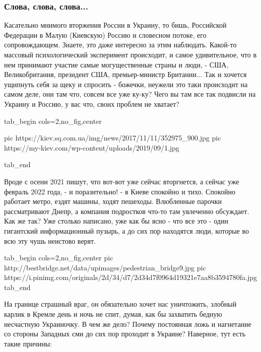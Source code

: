  
 
 
 
 
\clearpage
\subsubsection{Слова, слова, слова...}

Касательно мнимого вторжения России в Украину, то бишь, Российской Федерации в
Малую (Киевскую) Россию и словесном потоке, его сопровождающем.  Знаете, это
даже интересно за этим наблюдать. Какой-то массовый психологический эксперимент
происходит, и самое удивительное, что в нем принимают участие самые
могущественные страны и люди, - США, Великобритания, президент США,
премьер-министр Британии... Так и хочется ущипнуть себя за щеку и спросить -
божечки, неужели это таки происходит на самом деле, они там что, совсем все уже
ку-ку? Чего вы там все так подвисли на Украину и Россию, у вас что, своих
проблем не хватает?

\ifcmt
  tab_begin cols=2,no_fig,center

     pic https://kiev.sq.com.ua/img/news/2017/11/11/352975_900.jpg
		 pic https://my-kiev.com/wp-content/uploads/2019/09/1.jpg

  tab_end
\fi

Вроде с осени 2021 пишут, что вот-вот уже сейчас вторгнется, а сейчас уже
февраль 2022 года, - и поразительно! - в Киеве спокойно и тихо. Спокойно
работает метро, ездят машины, ходят пешеходы. Влюбленные парочки рассматривают
Днепр, а компания подростков что-то там увлеченно обсуждает.  Как же так? Уже
столько написано, уже как бы ясно - что все это - один гигантский
информационный пузырь, а до сих пор находятся люди, которые во всю эту чушь
неистово верят. 

\ifcmt
  tab_begin cols=2,no_fig,center
     pic http://bestbridge.net/data/upimages/pedestrian_bridge9.jpg
		 pic https://i.pinimg.com/originals/2d/34/d7/2d34d7f0964d19321e7aa8b3594780fa.jpg
  tab_end
\fi

На границе страшный враг, он обязательно хочет нас уничтожить, злобный карлик в
Кремле день и ночь не спит, думая, как бы захватить бедную несчастную
Украиночку. В чем же дело?  Почему постоянная ложь и нагнетание со стороны
Западных сми до сих пор проходит в Украине? Наверное, тут есть такие причины:

